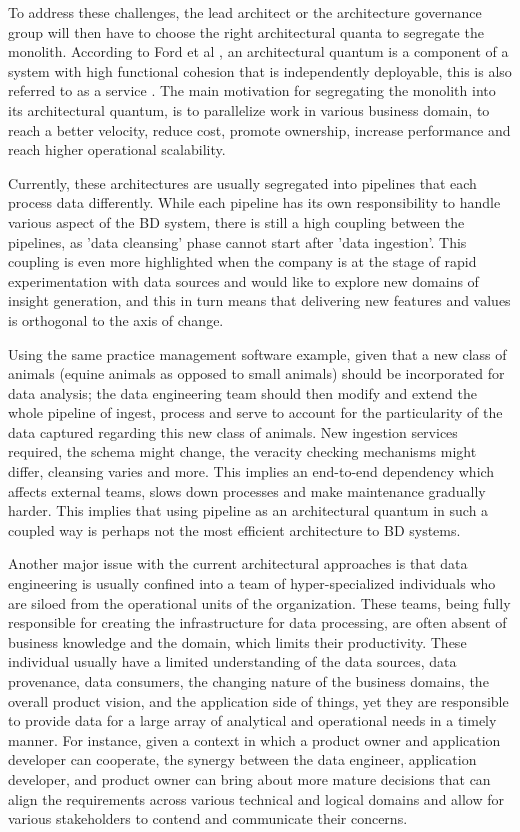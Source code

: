 \documentclass[review]{elsarticle}
\begin{document}
To address these challenges, the lead architect or the architecture governance group will then have to choose the right architectural quanta to segregate the monolith. According to Ford et al \cite{ford2017building}, an architectural quantum is a component of a system with high functional cohesion that is independently deployable, this is also referred to as a service \cite{newman2021building}. The main motivation for segregating the monolith into its architectural quantum, is to parallelize work in various business domain, to reach a better velocity, reduce cost, promote ownership, increase performance and reach higher operational scalability.

Currently, these architectures are usually segregated into pipelines that each process data differently. While each pipeline has its own responsibility to handle various aspect of the BD system, there is still a high coupling between the pipelines, as 'data cleansing' phase cannot start after 'data ingestion'. This coupling is even more highlighted when the company is at the stage of rapid experimentation with data sources and would like to explore new domains of insight generation, and this in turn means that delivering new features and values is orthogonal to the axis of change.

Using the same practice management software example, given that a new class of animals (equine animals as opposed to small animals) should be incorporated for data analysis; the data engineering team should then modify and extend the whole pipeline of ingest, process and serve to account for the particularity of the data captured regarding this new class of animals. New ingestion services required, the schema might change, the veracity checking mechanisms might differ, cleansing varies and more. This implies an end-to-end dependency which affects external teams, slows down processes and make maintenance gradually harder. This implies that using pipeline as an architectural quantum in such a coupled way is perhaps not the most efficient architecture to BD systems.

Another major issue with the current architectural approaches is that data engineering is usually confined into a team of hyper-specialized individuals who are siloed from the operational units of the organization. These teams, being fully responsible for creating the infrastructure for data processing, are often absent of business knowledge and the domain, which limits their productivity. These individual usually have a limited understanding of the data sources, data provenance, data consumers, the changing nature of the business domains, the overall product vision, and the application side of things, yet they are responsible to provide data for a large array of analytical and operational needs in a timely manner. For instance, given a context in which a product owner and application developer can cooperate, the synergy between the data engineer, application developer, and product owner can bring about more mature decisions that can align the requirements across various technical and logical domains and allow for various stakeholders to contend and communicate their concerns.
\end{document}
